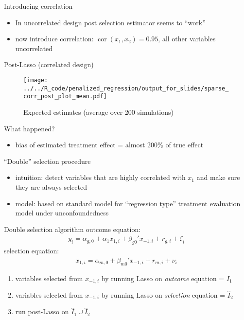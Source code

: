 \documentclass[xcolor=dvipsnames, handout]{beamer}
\DeclareMathOperator{\cor}{cor}
\begin{document}
\begin{frame}{Introducing correlation}
    \begin{itemize}
      \item In uncorrelated design post selection estimator seems to ``work''
      \item now introduce correlation: $\cor(x_1, x_2) = 0.95$, all other variables uncorrelated
    \end{itemize}
\end{frame}

\begin{frame}{Post-Lasso (correlated design)}
\begin{figure}
  \texttt{[image: ../../R\_code/penalized\_regression/output\_for\_slides/sparse\_corr\_post\_plot\_mean.pdf]}
   \caption{Expected estimates (average over 200 simulations)}
\end{figure}
\end{frame}

\begin{frame}{What happened?}
\begin{itemize}
  \item bias of estimated treatment effect = almost 200\% of true effect
\end{itemize}
\end{frame}

\begin{frame}{``Double'' selection procedure \parencite{belloni2014inference}}
\begin{itemize}[<+->]
  \item intuition: detect variables that are highly correlated with $x_1$ and make sure they are always selected
  \item model: based on standard model for ``regression type'' treatment evaluation model under unconfoundedness
\end{itemize}
\end{frame}

\begin{frame}{Double selection algorithm}
outcome equation:
\begin{align*}
  y_i = \alpha_{g, 0} + \alpha_1 x_{1,i} + \beta_{g0}' x_{-1, i} + r_{g, i} + \zeta_i
\end{align*}
selection equation: 
\begin{align*}
  x_{1, i} = \alpha_{m, 0} + \beta_{m0}' x_{-1, i} + r_{m, i} + \nu_i
\end{align*}
\begin{enumerate}[<+->]
  \item variables selected from $x_{-1, i}$ by running Lasso on \emph{outcome} equation = $\hat{I}_1$
  \item variables selected from $x_{-1, i}$ by running Lasso on \emph{selection} equation = $\hat{I}_2$
  \item run post-Lasso on $\hat{I}_1 \cup \hat{I}_2$
\end{enumerate}
\end{frame}
\end{document}
